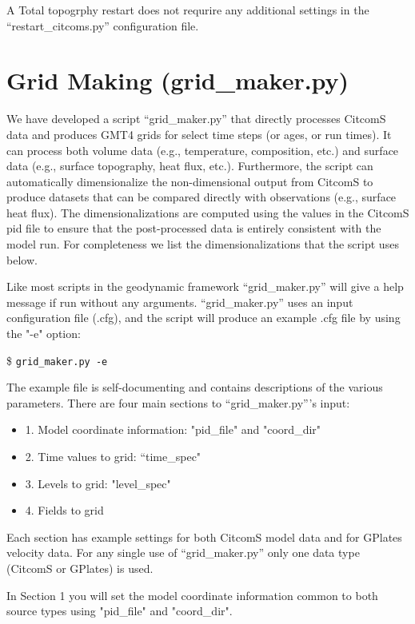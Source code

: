 \documentclass[letterpaper,12pt]{article}
\newcommand{\tm}[1]{\$ \texttt{#1}}
\begin{document}
A Total topogrphy restart does not requrire any additional settings in the ``restart\_citcoms.py'' configuration file.



\section{Grid Making (grid\_maker.py)}

We have developed a script ``grid\_maker.py'' that directly processes CitcomS data 
and produces GMT4 grids for select time steps (or ages, or run times).  
It can process both volume data (e.g., temperature, composition, etc.) and surface data (e.g., surface topography, heat flux, etc.).  
Furthermore, the script can automatically dimensionalize the non-dimensional output from CitcomS to produce datasets 
that can be compared directly with observations (e.g., surface heat flux).  
The dimensionalizations are computed using the values in the CitcomS pid file to ensure that the post-processed data 
is entirely consistent with the model run.  For completeness we list the dimensionalizations that the script uses below.

Like most scripts in the geodynamic framework ``grid\_maker.py'' will give a help message if run without any arguments. 
``grid\_maker.py'' uses an input configuration file (.cfg), and the script will produce an example .cfg file by using the "-e" option:

\tm{grid\_maker.py -e}

The example file is self-documenting and contains descriptions of the various parameters.  
There are four main sections to ``grid\_maker.py'''s input:

\begin{itemize}
\item 1. Model coordinate information: "pid\_file" and "coord\_dir"
\item 2. Time values to grid: ``time\_spec"
\item 3. Levels to grid: "level\_spec"
\item 4. Fields to grid
\end{itemize}

Each section has example settings for both CitcomS model data and for GPlates velocity data.  
For any single use of ``grid\_maker.py'' only one data type (CitcomS or GPlates) is used.

In Section 1 you will set the model coordinate information common to both source types using "pid\_file" and "coord\_dir".
\end{document}
